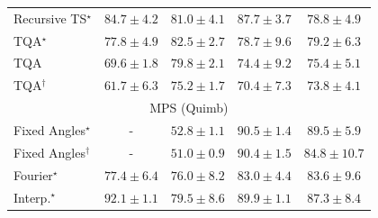 \begin{tabular}{l|cccc|}
Recursive TS$^\star$ & {\cellcolor[HTML]{852F91}} \color[HTML]{F1F1F1} $84.7\pm 4.2$ & {\cellcolor[HTML]{894FA3}} \color[HTML]{F1F1F1} $81.0\pm 4.1$ & {\cellcolor[HTML]{81127E}} \color[HTML]{F1F1F1} $87.7\pm 3.7$ & {\cellcolor[HTML]{8B61AC}} \color[HTML]{F1F1F1} $78.8\pm 4.9$ \\
TQA$^\star$ & {\cellcolor[HTML]{8C69B0}} \color[HTML]{F1F1F1} $77.8\pm 4.9$ & {\cellcolor[HTML]{88439E}} \color[HTML]{F1F1F1} $82.5\pm 2.7$ & {\cellcolor[HTML]{8B61AC}} \color[HTML]{F1F1F1} $78.7\pm 9.6$ & {\cellcolor[HTML]{8B5DAA}} \color[HTML]{F1F1F1} $79.2\pm 6.3$ \\
TQA & {\cellcolor[HTML]{95A8D0}} \color[HTML]{F1F1F1} $69.6\pm 1.8$ & {\cellcolor[HTML]{8A59A8}} \color[HTML]{F1F1F1} $79.8\pm 2.1$ & {\cellcolor[HTML]{8C84BD}} \color[HTML]{F1F1F1} $74.4\pm 9.2$ & {\cellcolor[HTML]{8C7CB9}} \color[HTML]{F1F1F1} $75.4\pm 5.1$ \\
TQA$^\dagger$ & {\cellcolor[HTML]{BFD3E6}} \color[HTML]{000000} $61.7\pm 6.3$ & {\cellcolor[HTML]{8C7DBA}} \color[HTML]{F1F1F1} $75.2\pm 1.7$ & {\cellcolor[HTML]{92A3CD}} \color[HTML]{F1F1F1} $70.4\pm 7.3$ & {\cellcolor[HTML]{8C89C0}} \color[HTML]{F1F1F1} $73.8\pm 4.1$ \\
\cline{1-5}
\multicolumn{5}{c}{\rule{0pt}{8pt}MPS (Quimb)} \\
\midrule
Fixed Angles$^\star$ & {\cellcolor[HTML]{000000}} \color[HTML]{F1F1F1} {\cellcolor{white}} \color{black} - & {\cellcolor[HTML]{FFFCD8}} \color[HTML]{000000} $52.8\pm 1.1$ & {\cellcolor[HTML]{812D05}} \color[HTML]{F1F1F1} $90.5\pm 1.4$ & {\cellcolor[HTML]{8B3005}} \color[HTML]{F1F1F1} $89.5\pm 5.9$ \\
Fixed Angles$^\dagger$ & {\cellcolor[HTML]{000000}} \color[HTML]{F1F1F1} {\cellcolor{white}} \color{black} - & {\cellcolor[HTML]{FFFFE5}} \color[HTML]{000000} $51.0\pm 0.9$ & {\cellcolor[HTML]{832D05}} \color[HTML]{F1F1F1} $90.4\pm 1.5$ & {\cellcolor[HTML]{B84203}} \color[HTML]{F1F1F1} $84.8\pm 10.7$ \\
Fourier$^\star$ & {\cellcolor[HTML]{EC7014}} \color[HTML]{F1F1F1} $77.4\pm 6.4$ & {\cellcolor[HTML]{F17C1A}} \color[HTML]{F1F1F1} $76.0\pm 8.2$ & {\cellcolor[HTML]{C94B02}} \color[HTML]{F1F1F1} $83.0\pm 4.4$ & {\cellcolor[HTML]{C44802}} \color[HTML]{F1F1F1} $83.6\pm 9.6$ \\
Interp.$^\star$ & {\cellcolor[HTML]{712806}} \color[HTML]{F1F1F1} $92.1\pm 1.1$ & {\cellcolor[HTML]{DF620D}} \color[HTML]{F1F1F1} $79.5\pm 8.6$ & {\cellcolor[HTML]{882F05}} \color[HTML]{F1F1F1} $89.9\pm 1.1$ & {\cellcolor[HTML]{A03704}} \color[HTML]{F1F1F1} $87.3\pm 8.4$ \\

\end{tabular}
